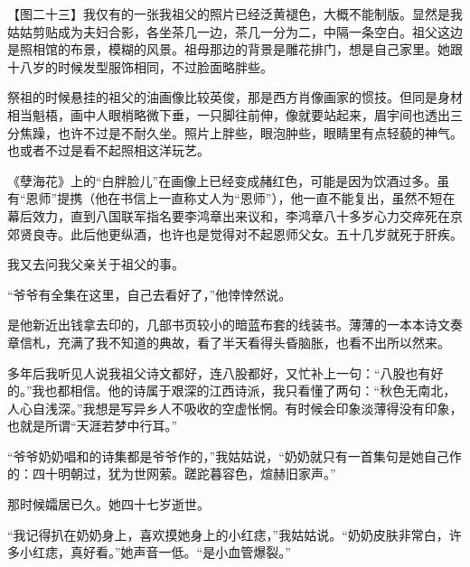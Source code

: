 \clearpage
\par 【图二十三】我仅有的一张我祖父的照片已经泛黄褪色，大概不能制版。显然是我姑姑剪贴成为夫妇合影，各坐茶几一边，茶几一分为二，中隔一条空白。祖父这边是照相馆的布景，模糊的风景。祖母那边的背景是雕花排门，想是自己家里。她跟十八岁的时候发型服饰相同，不过脸面略胖些。
\par 祭祖的时候悬挂的祖父的油画像比较英俊，那是西方肖像画家的惯技。但同是身材相当魁梧，画中人眼梢略微下垂，一只脚往前伸，像就要站起来，眉宇间也透出三分焦躁，也许不过是不耐久坐。照片上胖些，眼泡肿些，眼睛里有点轻藐的神气。也或者不过是看不起照相这洋玩艺。
\par 《孽海花》上的“白胖脸儿”在画像上已经变成赭红色，可能是因为饮酒过多。虽有“恩师”提携（他在书信上一直称丈人为“恩师”），他一直不能复出，虽然不短在幕后效力，直到八国联军指名要李鸿章出来议和，李鸿章八十多岁心力交瘁死在京郊贤良寺。此后他更纵酒，也许也是觉得对不起恩师父女。五十几岁就死于肝疾。
\par 我又去问我父亲关于祖父的事。
\par “爷爷有全集在这里，自己去看好了，”他悻悻然说。
\par 是他新近出钱拿去印的，几部书页较小的暗蓝布套的线装书。薄薄的一本本诗文奏章信札，充满了我不知道的典故，看了半天看得头昏脑胀，也看不出所以然来。
\par 多年后我听见人说我祖父诗文都好，连八股都好，又忙补上一句：“八股也有好的。”我也都相信。他的诗属于艰深的江西诗派，我只看懂了两句：“秋色无南北，人心自浅深。”我想是写异乡人不吸收的空虚怅惘。有时候会印象淡薄得没有印象，也就是所谓“天涯若梦中行耳。”
\par “爷爷奶奶唱和的诗集都是爷爷作的，”我姑姑说，“奶奶就只有一首集句是她自己作的：四十明朝过，犹为世网萦。蹉跎暮容色，煊赫旧家声。”
\par 那时候孀居已久。她四十七岁逝世。
\par “我记得扒在奶奶身上，喜欢摸她身上的小红痣，”我姑姑说。“奶奶皮肤非常白，许多小红痣，真好看。”她声音一低。“是小血管爆裂。”
